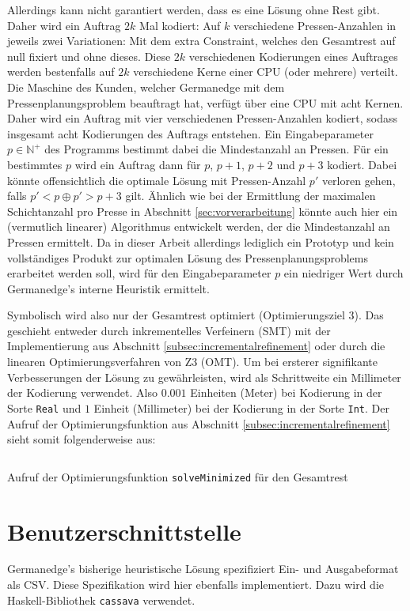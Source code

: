 Allerdings kann nicht garantiert werden, dass es eine Lösung ohne Rest gibt.
Daher wird ein Auftrag $2k$ Mal kodiert: Auf $k$ verschiedene Pressen-Anzahlen in jeweils zwei Variationen:
Mit dem extra Constraint, welches den Gesamtrest auf null fixiert und ohne dieses.
Diese $2k$ verschiedenen Kodierungen eines Auftrages werden bestenfalls auf $2k$ verschiedene Kerne einer CPU (oder mehrere) verteilt.
Die Maschine des Kunden, welcher Germanedge mit dem Pressenplanungsproblem beauftragt hat, verfügt über eine CPU mit acht Kernen.
Daher wird ein Auftrag mit vier verschiedenen Pressen-Anzahlen kodiert, sodass insgesamt acht Kodierungen des Auftrags entstehen.
Ein Eingabeparameter $p \in \mathbb{N}^+$ des Programms bestimmt dabei die Mindestanzahl an Pressen.
Für ein bestimmtes $p$ wird ein Auftrag dann für $p$, $p+1$, $p+2$ und $p+3$ kodiert.
Dabei könnte offensichtlich die optimale Lösung mit Pressen-Anzahl $p\prime$ verloren gehen, falls $p\prime < p \oplus p\prime > p + 3$ gilt.
Ähnlich wie bei der Ermittlung der maximalen Schichtanzahl pro Presse in Abschnitt \ref{sec:vorverarbeitung} könnte auch hier ein
(vermutlich linearer) Algorithmus entwickelt werden, der die Mindestanzahl an Pressen ermittelt.
Da in dieser Arbeit allerdings lediglich ein Prototyp und kein vollständiges Produkt zur optimalen Lösung des Pressenplanungsproblems erarbeitet werden soll,
wird für den Eingabeparameter $p$ ein niedriger Wert durch Germanedge's interne Heuristik ermittelt.

Symbolisch wird also nur der Gesamtrest optimiert (Optimierungsziel 3).
Das geschieht entweder durch inkrementelles Verfeinern (SMT) mit der Implementierung aus Abschnitt \ref{subsec:incrementalrefinement} oder durch
die linearen Optimierungsverfahren von Z3 (OMT).
Um bei ersterer signifikante Verbesserungen der Lösung zu gewährleisten, wird als Schrittweite ein Millimeter der Kodierung verwendet.
Also $0.001$ Einheiten (Meter) bei Kodierung in der Sorte \texttt{Real} und $1$ Einheit (Millimeter) bei der Kodierung in der Sorte \texttt{Int}.
Der Aufruf der Optimierungsfunktion aus Abschnitt \ref{subsec:incrementalrefinement} sieht somit folgenderweise aus:

\begin{listing}[H]
    \inputminted[linenos=true]{haskell}{Code/Implementierung/OptimizationTotalWaste.hs}
    \caption{Aufruf der Optimierungsfunktion \texttt{solveMinimized} für den Gesamtrest}
    \label{listing:solveminimized}
\end{listing}

\section{Benutzerschnittstelle}
Germanedge's bisherige heuristische Lösung spezifiziert Ein- und Ausgabeformat als CSV.
Diese Spezifikation wird hier ebenfalls implementiert.
Dazu wird die Haskell-Bibliothek \texttt{cassava} \cite{cassava} verwendet.

